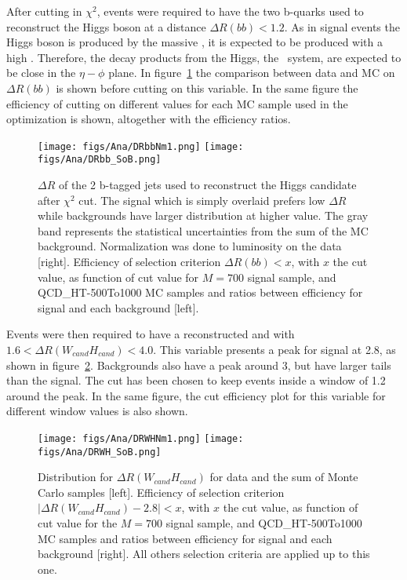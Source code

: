 After cutting in $\chi^{2}$, events were required to have the two b-quarks used to reconstruct the Higgs boson at a distance $\Delta R(bb)<1.2$. As in signal events the Higgs boson is produced by the massive \Tp, it is expected to be produced with a high \pt. Therefore, the decay products from the Higgs, the \bbbar~system, are expected to be close in the $\eta-\phi$ plane. In figure~\ref{fig:DRbb} the comparison between data and MC on $\Delta R(bb)$ is shown before cutting on this variable. In the same figure the efficiency of cutting on different values for each MC sample used in the optimization is shown, altogether with the efficiency ratios. %

\begin{figure}[!Hhtbp]
  \begin{center}
    \texttt{[image: figs/Ana/DRbbNm1.png]}
    \texttt{[image: figs/Ana/DRbb\_SoB.png]}
    \caption{$\Delta R$ of the 2 b-tagged jets used to reconstruct the Higgs candidate after $\chi^{2}$ cut. The signal which is simply overlaid prefers low $\Delta R$ while backgrounds have larger distribution at higher value. The gray band represents the statistical uncertainties from the sum of the MC background. Normalization was done to luminosity on the data [right]. Efficiency of selection criterion $\Delta R(bb)<x$, with $x$ the cut value, as function of cut value for $M=700$ \GeVcc signal sample, \ttbar and QCD\_HT-500To1000 MC samples and ratios between efficiency for signal and each background [left].}
    \label{fig:DRbb}
  \end{center}
\end{figure}

Events were then required to have a reconstructed \W and \Hb with $1.6<\Delta R (W_{cand} H_{cand})<4.0$. This variable presents a peak for signal at 2.8, as shown in figure~\ref{fig:DRWH}. Backgrounds also have a peak around 3, but have larger tails than the signal. The cut has been chosen to keep events inside a window of 1.2 around the peak. In the same figure, the cut efficiency plot for this variable for different window values is also shown.

\begin{figure}[!Hhtbp]
  \begin{center}
    \texttt{[image: figs/Ana/DRWHNm1.png]}
    \texttt{[image: figs/Ana/DRWH\_SoB.png]}
    \caption{Distribution for $\Delta R (W_{cand} H_{cand})$ for data and the sum of Monte Carlo samples [left]. Efficiency of selection criterion $|\Delta R(W_{cand} H_{cand})-2.8|<x$, with $x$ the cut value, as function of cut value for the $M=700$ \GeVcc signal sample, \ttbar and QCD\_HT-500To1000 MC samples and ratios between efficiency for signal and each background [right]. All others selection criteria are applied up to this one.}
    \label{fig:DRWH}
  \end{center}
\end{figure}

